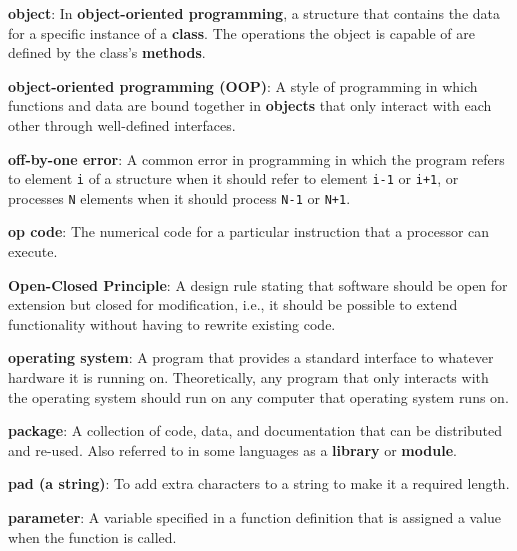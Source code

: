 \documentclass[krantzl]{krantz}
\newcommand{\glosskey}[1]{\textbf{#1}}
\begin{document}
\noindent \textbf{{\newline}\glosskey{object}}: 
In \glosskey{object-oriented programming}, a structure that contains the data for a specific instance of a \glosskey{class}. The operations the object is capable of are defined by the class’s \glosskey{methods}.


\noindent \textbf{{\newline}\glosskey{object-oriented programming} (OOP)}: 
A style of programming in which functions and data are bound together in \glosskey{objects} that only interact with each other through well-defined interfaces.


\noindent \textbf{{\newline}\glosskey{off-by-one error}}: 
A common error in programming in which the program refers to element \texttt{i} of a structure when it should refer to element \texttt{i-1} or \texttt{i+1}, or processes \texttt{N} elements when it should process \texttt{N-1} or \texttt{N+1}.


\noindent \textbf{{\newline}\glosskey{op code}}: 
The numerical code for a particular instruction that a processor can execute.


\noindent \textbf{{\newline}\glosskey{Open-Closed Principle}}: 
A design rule stating that software should be open for extension but closed for modification, i.e., it should be possible to extend functionality without having to rewrite existing code.


\noindent \textbf{{\newline}\glosskey{operating system}}: 
A program that provides a standard interface to whatever hardware it is running on. Theoretically, any program that only interacts with the operating system should run on any computer that operating system runs on.


\noindent \textbf{{\newline}\glosskey{package}}: 
A collection of code, data, and documentation that can be distributed and re-used. Also referred to in some languages as a \glosskey{library} or \glosskey{module}.


\noindent \textbf{{\newline}\glosskey{pad (a string)}}: 
To add extra characters to a string to make it a required length.


\noindent \textbf{{\newline}\glosskey{parameter}}: 
A variable specified in a function definition that is assigned a value when the function is called.
\end{document}
